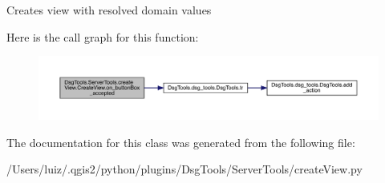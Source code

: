 \begin{DoxyVerb}Creates view with resolved domain values
\end{DoxyVerb}
 Here is the call graph for this function\+:
\nopagebreak
\begin{figure}[H]
\begin{center}
\leavevmode
\includegraphics[width=350pt]{class_dsg_tools_1_1_server_tools_1_1create_view_1_1_create_view_ad3e078ea1620699d079930bacbfba94d_cgraph}
\end{center}
\end{figure}


The documentation for this class was generated from the following file\+:\begin{DoxyCompactItemize}
\item 
/\+Users/luiz/.\+qgis2/python/plugins/\+Dsg\+Tools/\+Server\+Tools/create\+View.\+py\end{DoxyCompactItemize}
